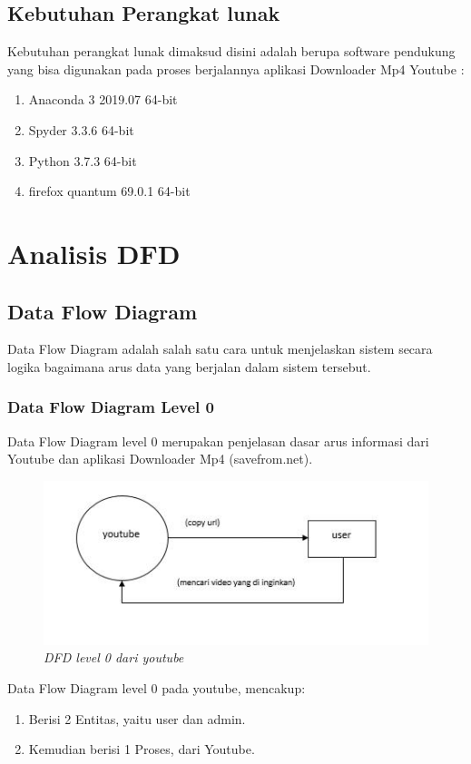 \subsection{Kebutuhan Perangkat lunak }
Kebutuhan perangkat lunak dimaksud disini adalah berupa software pendukung yang bisa digunakan pada proses berjalannya aplikasi Downloader Mp4 Youtube :
\begin{enumerate}
    \item Anaconda 3 2019.07 64-bit
    \item Spyder 3.3.6 64-bit
    \item Python 3.7.3 64-bit
    \item firefox quantum 69.0.1 64-bit
\end{enumerate}

\section{Analisis DFD}
\subsection{Data Flow Diagram}
Data Flow Diagram adalah salah satu cara untuk menjelaskan sistem secara logika bagaimana arus data yang berjalan dalam sistem tersebut.

\subsubsection{Data Flow Diagram Level 0}
Data Flow Diagram level 0 merupakan penjelasan dasar arus informasi dari Youtube dan aplikasi Downloader Mp4 {(savefrom.net)}.

\begin{figure}[!htbp]
    \centering
    \includegraphics[scale=1]{figure/youtube.jpeg}
    \caption{\textit{DFD level 0 dari youtube}}
    \label{gambar 1}
\end{figure}


Data Flow Diagram level 0 pada youtube, mencakup:
\begin{enumerate}
    \item Berisi 2 Entitas, yaitu user dan admin.
    \item Kemudian berisi 1 Proses, dari Youtube.
\end{enumerate}

